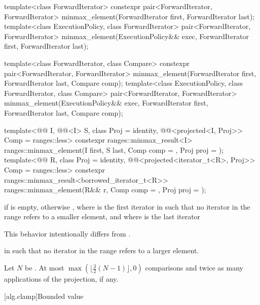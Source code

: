 %
\begin{itemdecl}
template<class ForwardIterator>
  constexpr pair<ForwardIterator, ForwardIterator>
    minmax_element(ForwardIterator first, ForwardIterator last);
template<class ExecutionPolicy, class ForwardIterator>
  pair<ForwardIterator, ForwardIterator>
    minmax_element(ExecutionPolicy&& exec,
                   ForwardIterator first, ForwardIterator last);

template<class ForwardIterator, class Compare>
  constexpr pair<ForwardIterator, ForwardIterator>
    minmax_element(ForwardIterator first, ForwardIterator last, Compare comp);
template<class ExecutionPolicy, class ForwardIterator, class Compare>
  pair<ForwardIterator, ForwardIterator>
    minmax_element(ExecutionPolicy&& exec,
                   ForwardIterator first, ForwardIterator last, Compare comp);

template<@@ I, @@<I> S, class Proj = identity,
         @@<projected<I, Proj>> Comp = ranges::less>
  constexpr ranges::minmax_result<I>
    ranges::minmax_element(I first, S last, Comp comp = {}, Proj proj = {});
template<@@ R, class Proj = identity,
         @@<projected<iterator_t<R>, Proj>> Comp = ranges::less>
  constexpr ranges::minmax_result<borrowed_iterator_t<R>>
    ranges::minmax_element(R&& r, Comp comp = {}, Proj proj = {});
\end{itemdecl}


\begin{itemdescr}
\pnum
\returns
{} if  is empty, otherwise
, where  is
the first iterator in  such that no iterator in the range refers
to a smaller element, and where  is the last iterator
\begin{footnote}
This behavior
intentionally differs from .
\end{footnote}
in  such that no iterator in the range refers to a larger element.

\pnum
\complexity
Let $N$ be .
At most $\max(\bigl\lfloor{\frac{3}{2}} (N-1)\bigr\rfloor, 0)$ comparisons and
twice as many applications of the projection, if any.
\end{itemdescr}

[alg.clamp]{Bounded value}


